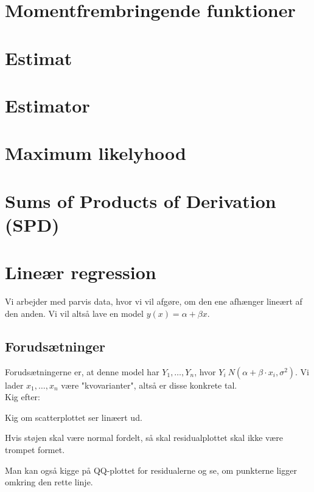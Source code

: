 \documentclass{article}
\begin{document}
\section*{Momentfrembringende funktioner}

\section*{Estimat}

\section*{Estimator}


\section*{Maximum likelyhood}

\section*{Sums of Products of Derivation (SPD)}

\section*{Lineær regression}
Vi arbejder med parvis data, hvor vi vil afgøre, om den ene afhænger lineært af den anden. Vi vil altså lave en model $y(x) = \alpha + \beta x$.\\
\subsection*{Forudsætninger}
Forudsætningerne er, at denne model har $Y_1, \hdots, Y_n$, hvor $Y_i ~ N(\alpha + \beta \cdot x_i, \sigma^2)$. Vi lader $x_1, \hdots, x_n$ være "kvovarianter", altså er disse konkrete tal.\\
Kig efter:\\
\begin{itemize*}
  \item Kig om scatterplottet ser linæert ud.
  \item Hvis støjen skal være normal fordelt, så skal residualplottet skal ikke være trompet formet.
  \item Man kan også kigge på QQ-plottet for residualerne og se, om punkterne ligger omkring den rette linje.
\end{itemize*}
\end{document}
